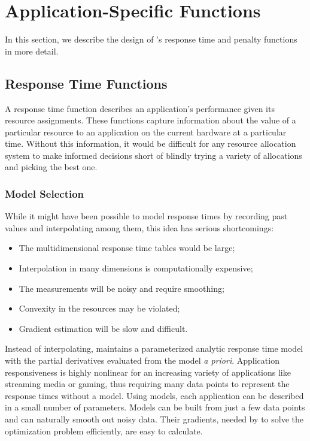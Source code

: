 \section{Application-Specific Functions}\label{app_func}


In this section, we describe the design of \pacora's response time and penalty functions in more detail.

\subsection{Response Time Functions}
A response time function describes an application's performance given its resource assignments.  These functions capture information about the value of a particular resource to an application on the current hardware at a particular time. Without this information, it would be difficult for any resource allocation system to make informed decisions short of blindly trying a variety of allocations and picking the best one.

\subsubsection{Model Selection} While it might have been possible to model response times by recording past values and interpolating among them, this idea has serious shortcomings:
\begin{itemize}
\item The multidimensional response time tables would be large;
\item Interpolation in many dimensions is computationally expensive;
\item The measurements will be noisy and require smoothing;
\item Convexity in the resources may be violated;
\item Gradient estimation will be slow and difficult.
\end{itemize}

Instead of interpolating, \pacora maintains a parameterized analytic response time model with the partial derivatives evaluated from the model \emph{a priori}. Application responsiveness is highly nonlinear for an increasing variety of applications like streaming media or gaming, thus requiring many data points to represent the response times without a model. Using models, each application can be described in a small number of parameters.  Models can be built from just a few data points and can naturally smooth out noisy data. Their gradients, needed by \pacora to solve the optimization problem efficiently, are easy to calculate.

